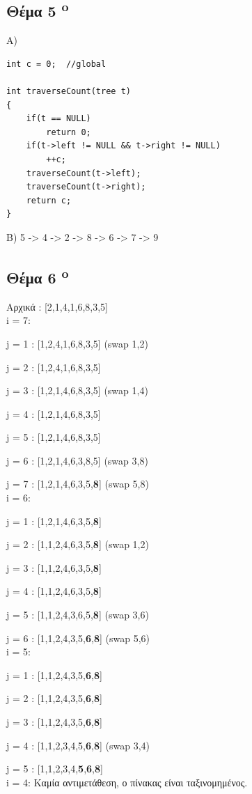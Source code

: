 \documentclass[a4paper,10pt]{article}
\begin{document}
\subsection{Θέμα 5 \textsuperscript{o}}
A)\\
\begin{lstlisting}
int c = 0;	//global

int traverseCount(tree t)
{
	if(t == NULL)
		return 0;
	if(t->left != NULL && t->right != NULL)
		++c;
	traverseCount(t->left);
	traverseCount(t->right);
	return c;
}
\end{lstlisting}

B)
5 -> 4 -> 2 -> 8 -> 6 -> 7 -> 9

\subsection{Θέμα 6 \textsuperscript{o}}
Αρχικά : [2,1,4,1,6,8,3,5]\\
i = 7:

j = 1 : [1,2,4,1,6,8,3,5] (swap 1,2)

j = 2 : [1,2,4,1,6,8,3,5]

j = 3 : [1,2,1,4,6,8,3,5] (swap 1,4)

j = 4 : [1,2,1,4,6,8,3,5]

j = 5 : [1,2,1,4,6,8,3,5]

j = 6 : [1,2,1,4,6,3,8,5] (swap 3,8)

j = 7 : [1,2,1,4,6,3,5,\textbf{8}] (swap 5,8)
\\
i = 6:

j = 1 : [1,2,1,4,6,3,5,\textbf{8}]

j = 2 : [1,1,2,4,6,3,5,\textbf{8}] (swap 1,2)

j = 3 : [1,1,2,4,6,3,5,\textbf{8}]

j = 4 : [1,1,2,4,6,3,5,\textbf{8}]

j = 5 : [1,1,2,4,3,6,5,\textbf{8}] (swap 3,6)

j = 6 : [1,1,2,4,3,5,\textbf{6},\textbf{8}] (swap 5,6)
\\
i = 5:

j = 1 : [1,1,2,4,3,5,\textbf{6},\textbf{8}]

j = 2 : [1,1,2,4,3,5,\textbf{6},\textbf{8}]

j = 3 : [1,1,2,4,3,5,\textbf{6},\textbf{8}]

j = 4 : [1,1,2,3,4,5,\textbf{6},\textbf{8}] (swap 3,4)

j = 5 : [1,1,2,3,4,\textbf{5},\textbf{6},\textbf{8}]
\\
i = 4: Καμία αντιμετάθεση, ο πίνακας είναι ταξινομημένος.
\end{document}
